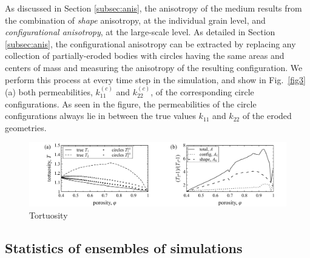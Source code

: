 \documentclass[3p]{elsarticle}
\begin{document}
As discussed in Section \ref{subsec:anis}, the anisotropy of the medium results from the combination of {\em shape} anisotropy, at the individual grain level, and {\em configurational anisotropy}, at the large-scale level. As detailed in Section \ref{subsec:anis}, the configurational anisotropy can be extracted by replacing any collection of partially-eroded bodies with circles having the same areas and centers of mass and measuring the anisotropy of the resulting configuration. We perform this process at every time step in the simulation, and show in Fig.~\ref{fig3}(a) both permeabilities, $k_{11}^{(c)}$ and $k_{22}^{(c)}$, of the corresponding circle configurations. As seen in the figure, the permeabilities of the circle configurations always lie in between the true values $k_{11}$ and $k_{22}$ of the eroded geometries.



\begin{figure}%
\centering
\includegraphics[width = 0.99 \textwidth]{./figs/fig4.pdf}
\caption{
Tortuosity
\label{fig4}
}
\end{figure}





\subsection{Statistics of ensembles of simulations}
\end{document}
